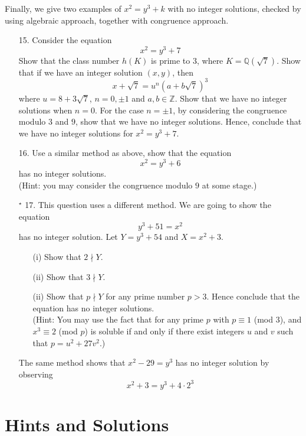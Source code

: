 Finally, we give two examples of $x^2=y^3+k$ with no integer solutions, checked by using algebraic approach, together with congruence approach.
\begin{enumerate}
\item[15.] Consider the equation
$$x^2=y^3+7$$
Show that the class number $h(K)$ is prime to $3$, where $K=\mathbb{Q}(\sqrt{7})$. Show that if we have an integer solution $(x,y)$, then
$$x+\sqrt{7}=u^n (a+b\sqrt{7})^3$$
where $u=8+3\sqrt{7}$, $n=0,\pm 1$ and $a,b \in \mathbb{Z}$. Show that we have no integer solutions when $n=0$.
For the case $n=\pm 1$, by considering the congruence modulo $3$ and $9$, show that we have no integer solutions. Hence, conclude that we have no integer solutions for $x^2=y^3+7$.\\
\item[16.] Use a similar method as above, show that the equation
$$x^2=y^3+6$$
has no integer solutions.\\
(Hint: you may consider the congruence modulo $9$ at some stage.)
\item[$^\star$ 17.] This question uses a different method. We are going to show the equation
$$y^3+51=x^2$$
has no integer solution. Let $Y=y^3+54$ and $X=x^2+3$.
\begin{enumerate}
\item[(i)] Show that $2 \nmid Y$.
\item[(ii)] Show that $3 \nmid Y$.
\item[(ii)] Show that $p \nmid Y$ for any prime number $p>3$. Hence conclude that the equation has no integer solutions.\\
    (Hint: You may use the fact that for any prime $p$ with $p \equiv 1$ (mod $3$), and
    $x^3 \equiv 2$ (mod $p$) is soluble if and only if there exist integers $u$ and $v$ such that
    $p=u^2+27v^2$.)
\end{enumerate}
\begin{remark}
The same method shows that $x^2-29=y^3$ has no integer solution by observing
$$x^2+3=y^3+4\cdot 2^3$$
\end{remark}
\end{enumerate}


\section{Hints and Solutions}
